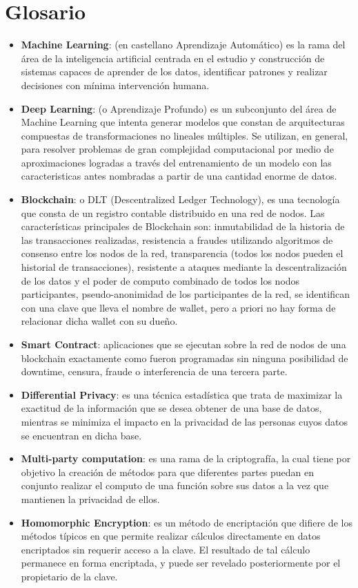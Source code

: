 \documentclass[
11pt, %
oneside, %
spanish, %
singlespacing, %
parskip, %
headsepline, %
chapterinoneline, %
]{MastersDoctoralThesis} %
\begin{document}
\chapter{Glosario}
\begin{itemize}
\item \textbf{Machine Learning}: (en castellano Aprendizaje Automático) es la rama del área de la inteligencia artificial centrada en el estudio y construcción de sistemas capaces de aprender de los datos, identificar patrones y realizar decisiones con mínima intervención humana. 
\item \textbf{Deep Learning}: (o Aprendizaje Profundo) es un subconjunto del área de Machine Learning que intenta generar modelos que constan de arquitecturas compuestas de transformaciones no lineales múltiples. Se utilizan, en general, para resolver problemas de gran complejidad computacional por medio de aproximaciones logradas a través del entrenamiento de un modelo con las caracteristicas antes nombradas a partir de una cantidad enorme de datos.
\item \textbf{Blockchain}: o DLT (Descentralized Ledger Technology), es una tecnología que consta de un registro contable distribuido en una red de nodos. Las características principales de Blockchain son: inmutabilidad de la historia de las transacciones realizadas, resistencia a fraudes utilizando algoritmos de consenso entre los nodos de la red, transparencia (todos los nodos pueden el historial de transacciones), resistente a ataques mediante la descentralización de los datos y el poder de computo combinado de todos los nodos participantes, pseudo-anonimidad de los participantes de la red, se identifican con una clave que lleva el nombre de wallet, pero a  priori no hay forma de relacionar dicha wallet con su dueño.
\item \textbf{Smart Contract}: aplicaciones que se ejecutan sobre la red de nodos de una blockchain exactamente como fueron programadas sin ninguna posibilidad de downtime, censura, fraude o interferencia de una tercera parte.
\item \textbf{Differential Privacy}: es una técnica estadística que trata de maximizar la exactitud de la información que se desea obtener de una base de datos, mientras se minimiza el impacto  en la privacidad de las personas cuyos datos se encuentran en dicha base.
\item \textbf{Multi-party computation}: es una rama de la criptografía, la cual tiene por objetivo la creación de métodos para que diferentes partes puedan en conjunto realizar el computo de una función sobre sus datos a la vez que mantienen la privacidad de ellos.
\item \textbf{Homomorphic Encryption}: es un método de encriptación que difiere de los métodos típicos en que permite realizar cálculos directamente en datos encriptados sin requerir acceso a la clave. El resultado de tal cálculo permanece en forma encriptada, y puede ser revelado posteriormente por el propietario de la clave.
\end{itemize}


\end{document}
